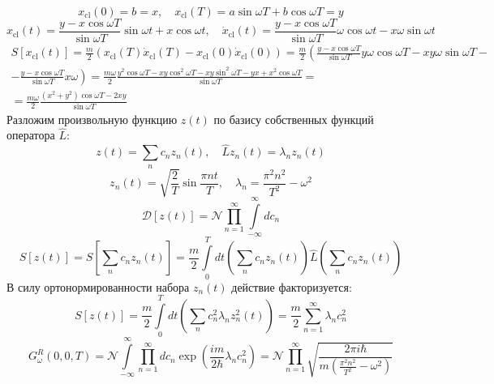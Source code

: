 \documentclass[12pt]{article}
\theoremstyle{definition}
\begin{document}
\begin{equation}
    x_\text{cl}(0)=b=x,\quad x_\text{cl}(T)=a\sin\omega T+b\cos\omega T=y
\end{equation}
\begin{equation}
    x_\text{cl}(t)=\frac{y-x\cos\omega T}{\sin\omega T}\sin\omega t+x\cos\omega t,\quad \dot{x}_\text{cl}(t)=\frac{y-x\cos\omega T}{\sin\omega T}\omega\cos\omega t-x\omega\sin\omega t
\end{equation}
\begin{multline}
    S[x_\text{cl}(t)]=\frac{m}{2}(x_\text{cl}(T)\dot{x}_\text{cl}(T)-x_\text{cl}(0)\dot{x}_\text{cl}(0))=\frac{m}{2}\left(\frac{y-x\cos\omega T}{\sin\omega T}y\omega\cos\omega T-xy\omega\sin\omega T\right.-\\-\left.\frac{y-x\cos\omega T}{\sin\omega T}x\omega\right)=\frac{m\omega}{2}\frac{y^2\cos\omega T-xy\cos^2\omega T-xy\sin^2\omega T-yx+x^2\cos\omega T}{\sin\omega T}=\\=\frac{m\omega}{2}\frac{(x^2+y^2)\cos\omega T-2xy}{\sin\omega T}
\end{multline}
Разложим произвольную функцию $z(t)$ по базису собственных функций оператора $\hat{L}$:
\begin{equation}
    z(t)=\sum\limits_nc_nz_n(t),\quad\hat{L}z_n(t)=\lambda_nz_n(t)
\end{equation}
\begin{equation}
    z_n(t)=\sqrt{\frac{2}{T}}\sin\frac{\pi nt}{T},\quad\lambda_n=\frac{\pi^2n^2}{T^2}-\omega^2
\end{equation}
\begin{equation}
    \mathcal{D}[z(t)]=\mathcal{N}\prod\limits_{n=1}^\infty\int\limits_{-\infty}^\infty dc_n
\end{equation}
\begin{equation}
    S[z(t)]=S\left[\sum\limits_nc_nz_n(t)\right]=\frac{m}{2}\int\limits_0^Tdt\left(\sum\limits_nc_nz_n(t)\right)\hat{L}\left(\sum\limits_nc_nz_n(t)\right)
\end{equation}
В силу ортонормированности набора $z_n(t)$ действие факторизуется:
\begin{equation}
    S[z(t)]=\frac{m}{2}\int\limits_0^Tdt\left(\sum\limits_nc^2_n\lambda_nz^2_n(t)\right)=\frac{m}{2}\sum\limits_{n=1}^\infty\lambda_nc_n^2
\end{equation}
\begin{equation}
    G^R_\omega(0,0,T)=\mathcal{N}\int\limits_{-\infty}^\infty\prod\limits_{n=1}^\infty dc_n\exp\left(\frac{im}{2\hbar}\lambda_nc_n^2\right)=\mathcal{N}\prod\limits_{n=1}^\infty\sqrt{\frac{2\pi i\hbar}{m\left(\frac{\pi^2n^2}{T^2}-\omega^2\right)}}
\end{equation}
\end{document}
